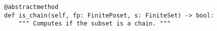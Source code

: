 \begin{verbatim}
@abstractmethod
def is_chain(self, fp: FinitePoset, s: FiniteSet) -> bool:
    """ Computes if the subset is a chain. """
\end{verbatim}